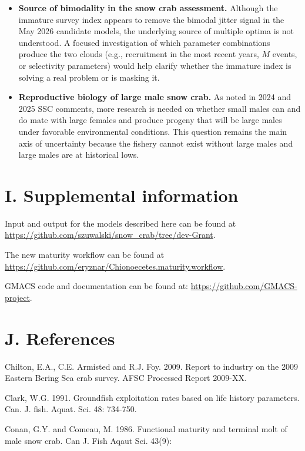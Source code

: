 \documentclass[
]{article}
\begin{document}
\begin{itemize}
\item
  \textbf{Source of bimodality in the snow crab assessment.} Although the immature survey index appears to remove the bimodal jitter signal in the May 2026 candidate models, the underlying source of multiple optima is not understood. A focused investigation of which parameter combinations produce the two clouds (e.g., recruitment in the most recent years, \(M\) events, or selectivity parameters) would help clarify whether the immature index is solving a real problem or is masking it.
\item
  \textbf{Reproductive biology of large male snow crab.} As noted in 2024 and 2025 SSC comments, more research is needed on whether small males can and do mate with large females and produce progeny that will be large males under favorable environmental conditions. This question remains the main axis of uncertainty because the fishery cannot exist without large males and large males are at historical lows.
\end{itemize}

\section{I. Supplemental information}\label{i.-supplemental-information}

Input and output for the models described here can be found at \url{https://github.com/szuwalski/snow_crab/tree/dev-Grant}.

The new maturity workflow can be found at \url{https://github.com/eryznar/Chionoecetes.maturity.workflow}.

GMACS code and documentation can be found at: \url{https://github.com/GMACS-project}.

\newpage

\section{J. References}\label{j.-references}

Chilton, E.A., C.E. Armisted and R.J. Foy. 2009. Report to industry on the 2009 Eastern Bering Sea crab survey. AFSC Processed Report 2009-XX.

Clark, W.G. 1991. Groundfish exploitation rates based on life history parameters. Can. J. fish. Aquat. Sci. 48: 734-750.

Conan, G.Y. and Comeau, M. 1986. Functional maturity and terminal molt of male snow crab. Can J. Fish Aqaut Sci. 43(9):
\end{document}
